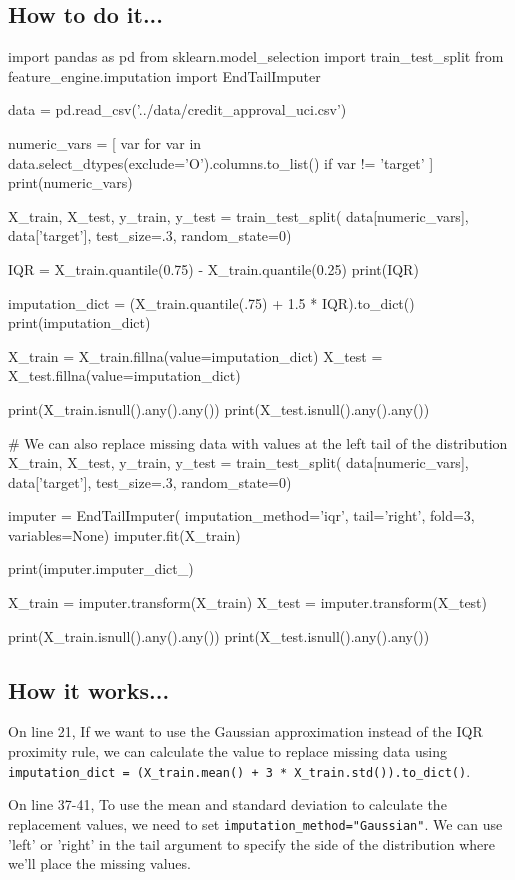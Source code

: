 \subsection{How to do it...}
\begin{pyc}
import pandas as pd
from sklearn.model_selection import train_test_split
from feature_engine.imputation import EndTailImputer

data = pd.read_csv('../data/credit_approval_uci.csv')

numeric_vars = [
    var for var in data.select_dtypes(exclude='O').columns.to_list() if var != 'target'
]
print(numeric_vars)

X_train, X_test, y_train, y_test = train_test_split(
    data[numeric_vars],
    data['target'],
    test_size=.3,
    random_state=0)

IQR = X_train.quantile(0.75) - X_train.quantile(0.25)
print(IQR)

imputation_dict = (X_train.quantile(.75) + 1.5 * IQR).to_dict()
print(imputation_dict)

X_train = X_train.fillna(value=imputation_dict)
X_test = X_test.fillna(value=imputation_dict)

print(X_train.isnull().any().any())
print(X_test.isnull().any().any())

# We can also replace missing data with values at the left tail of the distribution
X_train, X_test, y_train, y_test = train_test_split(
    data[numeric_vars],
    data['target'],
    test_size=.3,
    random_state=0)

imputer = EndTailImputer(
    imputation_method='iqr',
    tail='right',
    fold=3,
    variables=None)
imputer.fit(X_train)

print(imputer.imputer_dict_)

X_train = imputer.transform(X_train)
X_test = imputer.transform(X_test)

print(X_train.isnull().any().any())
print(X_test.isnull().any().any())
\end{pyc}
\subsection{How it works...}
On line 21, If we want to use the Gaussian approximation instead of the IQR proximity rule, we can calculate
the value to replace missing data using \verb|imputation_dict = (X_train.mean() + 3 * X_train.std()).to_dict()|.

On line 37-41, To use the mean and standard deviation to calculate the replacement values, we need to set
\verb|imputation_method="Gaussian"|. We can use 'left' or 'right' in the tail
argument to specify the side of the distribution where we’ll place the missing values.

